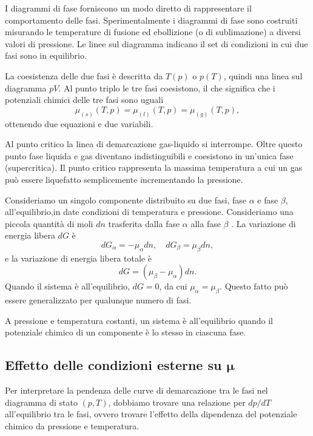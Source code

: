 I diagrammi di fase forniscono un modo diretto di rappresentare il comportamento delle fasi. Sperimentalmente i diagrammi di fase sono costruiti misurando le temperature di fusione ed ebollizione (o di sublimazione) a diversi valori di pressione. Le linee sul diagramma indicano il set di condizioni in cui due fasi sono in equilibrio.

La coesistenza delle due fasi è descritta da $T(p)$ o $p(T)$, quindi una linea sul diagramma $pV$. Al punto triplo le tre fasi coesistono, il che significa che i potenziali chimici delle tre fasi sono uguali
\begin{equation}
    \mu_{\left(s\right)}(T,p)=\mu_{\left(l\right)}(T,p)=\mu_{\left(g\right)}(T,p),
\end{equation}
ottenendo due equazioni e due variabili.

Al punto critico la linea di demarcazione gas-liquido si interrompe. Oltre questo punto fase liquida e gas diventano indistinguibili e coesistono in un'unica fase (supercritica). Il punto critico rappresenta la massima temperatura a cui un gas può essere liquefatto semplicemente incrementando la pressione. 

Consideriamo un singolo componente distribuito su due fasi, fase $\alpha$ e fase $\beta$, all'equilibrio,in date condizioni di temperatura e pressione. Consideriamo una piccola quantità di moli $dn$ trasferita dalla fase $\alpha$ alla fase $\beta$ . La variazione di energia libera $dG$ è
\begin{equation}
    dG_\alpha=-\mu_\alpha dn,\quad dG_\beta=\mu_\beta dn,
\end{equation}
e la variazione di energia libera totale è
\begin{equation}
    dG=\left(\mu_\beta-\mu_\alpha\right)dn.
\end{equation}
Quando il sistema è all'equilibrio, $dG=0$, da cui $\mu_\alpha=\mu_\beta$. Questo fatto può essere generalizzato per qualunque numero di fasi.
\begin{teo}
    A pressione e temperatura costanti, un sistema è all'equilibrio quando il potenziale chimico di un componente è lo stesso in ciascuna fase. 
\end{teo}

\subsection{Effetto delle condizioni esterne su \texorpdfstring{$\bm{\mu}$}{potenziale chimico}}
Per interpretare la pendenza delle curve di demarcazione tra le fasi nel diagramma di stato $(p,T)$, dobbiamo trovare una relazione per $dp/dT$ all'equilibrio tra le fasi, ovvero trovare l'effetto della dipendenza del potenziale chimico da pressione e temperatura. 

